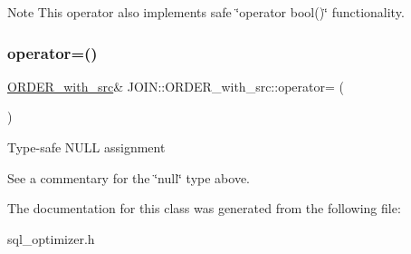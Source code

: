 \begin{DoxyNote}{Note}
This operator also implements safe \char`\"{}operator bool()\char`\"{} functionality. 
\end{DoxyNote}
\mbox{\label{classJOIN_1_1ORDER__with__src_a49eb9a1753368a1a8cb497ec2b76e468}} 
\subsubsection{\texorpdfstring{operator=()}{operator=()}}
{\footnotesize\ttfamily \mbox{\hyperlink{classJOIN_1_1ORDER__with__src}{O\+R\+D\+E\+R\+\_\+with\+\_\+src}}\& J\+O\+I\+N\+::\+O\+R\+D\+E\+R\+\_\+with\+\_\+src\+::operator= (\begin{DoxyParamCaption}\item[{null $\ast$}]{ }\end{DoxyParamCaption})\hspace{0.3cm}{\ttfamily [inline]}}

Type-\/safe N\+U\+LL assignment

See a commentary for the \char`\"{}null\char`\"{} type above. 

The documentation for this class was generated from the following file\+:\begin{DoxyCompactItemize}
\item 
sql\+\_\+optimizer.\+h\end{DoxyCompactItemize}
